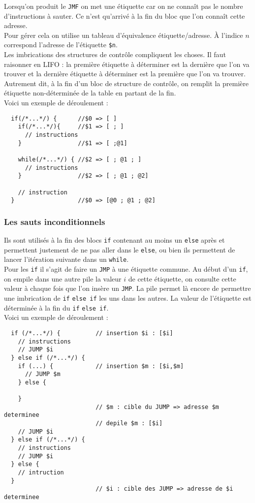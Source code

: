 Lorsqu'on produit le \texttt{JMF} on met une étiquette car on ne connaît pas le nombre d’instructions à sauter. Ce n’est qu’arrivé à la fin du bloc que l’on connaît cette adresse.\\
Pour gérer cela on utilise un tableau d’équivalence étiquette/adresse. À l’indice $n$ correspond l’adresse de l’étiquette \texttt{\$n}.\\
Les imbrications des structures de contrôle compliquent les choses. Il faut raisonner en LIFO : la première étiquette à déterminer est la dernière que l’on va trouver et la dernière étiquette à déterminer est la première que l’on va trouver. Autrement dit, à la fin d’un bloc de structure de contrôle, on remplit la première étiquette non-déterminée de la table en partant de la fin.\\

Voici un exemple de déroulement :
\begin{verbatim}
  if(/*...*/) {      //$0 => [ ]
    if(/*...*/){     //$1 => [ ; ]
      // instructions
    }                //$1 => [ ;@1]

    while(/*...*/) { //$2 => [ ; @1 ; ]
      // instructions
    }                //$2 => [ ; @1 ; @2]

    // instruction
  }                  //$0 => [@0 ; @1 ; @2]
\end{verbatim}

\subsubsection*{Les sauts inconditionnels}

Ils sont utilisés à la fin des blocs \texttt{if} contenant au moins un \texttt{else} après et permettent justement de ne pas aller dans le \texttt{else}, ou bien ils permettent de lancer l’itération suivante dans un \texttt{while}.\\
Pour les \texttt{if} il s’agit de faire un \texttt{JMP} à une étiquette commune. Au début d’un \texttt{if}, on empile dans une autre pile la valeur $i$  de cette étiquette, on consulte cette valeur à chaque fois que l’on insère un \texttt{JMP}. La pile permet là encore de permettre une imbrication de \texttt{if} \texttt{else if} les uns dans les autres. La valeur de l’étiquette est déterminée à la fin du \texttt{if} \texttt{else if}.\\

Voici un exemple de déroulement :
\begin{verbatim}
  if (/*...*/) {          // insertion $i : [$i]
    // instructions
    // JUMP $i
  } else if (/*...*/) {
    if (...) {            // insertion $m : [$i,$m]
      // JUMP $m
    } else {

    }
                          // $m : cible du JUMP => adresse $m determinee
                          // depile $m : [$i]
    // JUMP $i
  } else if (/*...*/) {
    // instructions
    // JUMP $i
  } else {
    // intruction
  }
                          // $i : cible des JUMP => adresse de $i determinee
\end{verbatim}

